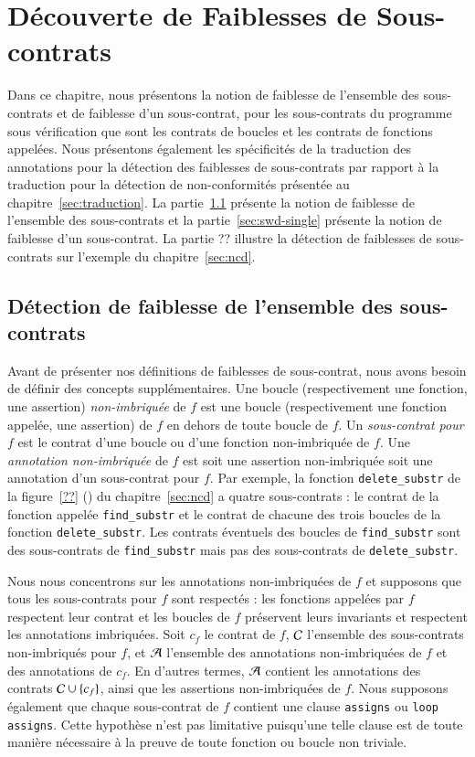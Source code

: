 
\chapter{Découverte de Faiblesses de Sous-contrats}
\label{sec:swd}

\chapterintro

Dans ce chapitre, nous présentons la notion de faiblesse de l'ensemble des
sous-contrats et de faiblesse d'un sous-contrat, pour les sous-contrats du
programme sous vérification que sont les contrats de boucles et les contrats
de fonctions appelées.
Nous présentons également les spécificités de la traduction des annotations pour
la détection des faiblesses de sous-contrats par rapport à la traduction pour la
détection de non-conformités présentée au chapitre~\ref{sec:traduction}.
La partie~\ref{sec:swd-global} présente la notion de faiblesse de l'ensemble des
sous-contrats et la partie~\ref{sec:swd-single} présente la notion de faiblesse
d'un sous-contrat.
La partie ?? illustre la détection de faiblesses de sous-contrats sur l'exemple
du chapitre~\ref{sec:ncd}.


\section{Détection de faiblesse de l'ensemble des sous-contrats}
\label{sec:swd-global}


Avant de présenter nos définitions de faiblesses de sous-contrat, nous avons
besoin de définir des concepts supplémentaires.
Une boucle (respectivement une fonction, une assertion) \emph{non-imbriquée} de
$f$ est une boucle (respectivement une fonction appelée, une assertion) de $f$
en dehors de toute boucle de $f$.
Un \emph{sous-contrat pour $f$} est le contrat d'une boucle ou d'une fonction
non-imbriquée de $f$.
Une \emph{annotation non-imbriquée} de $f$ est soit une assertion non-imbriquée
soit une annotation d'un sous-contrat pour $f$.
Par exemple, la fonction \lstinline'delete_substr' de la
figure~\ref{??} () du chapitre~\ref{sec:ncd} a quatre
sous-contrats : le contrat de la fonction appelée \lstinline'find_substr' et le
contrat de chacune des trois boucles de la fonction \lstinline'delete_substr'.
Les contrats éventuels des boucles de \lstinline'find_substr' sont des
sous-contrats de \lstinline'find_substr' mais pas des sous-contrats de
\lstinline'delete_substr'.

Nous nous concentrons sur les annotations non-imbriquées de $f$ et supposons que
tous les sous-contrats pour $f$ sont respectés : les fonctions appelées par $f$
respectent leur contrat et les boucles de $f$ préservent leurs invariants et
respectent les annotations imbriquées.
Soit $c_f$ le contrat de $f$, ${\mathcal{C}}$ l'ensemble des sous-contrats non-imbriqués
pour $f$, et ${\mathcal{A}}$ l'ensemble des annotations non-imbriquées de $f$ et des
annotations de $c_f$.
En d'autres termes, ${\mathcal{A}}$ contient les annotations des contrats ${\mathcal{C}}\cup\{c_f\}$,
ainsi que les assertions non-imbriquées de $f$.
Nous supposons également que chaque sous-contrat de $f$ contient une clause
\lstinline'assigns' ou \lstinline'loop assigns'.
Cette hypothèse n'est pas limitative puisqu'une telle clause est de toute
manière nécessaire à la preuve de toute fonction ou boucle non triviale.


